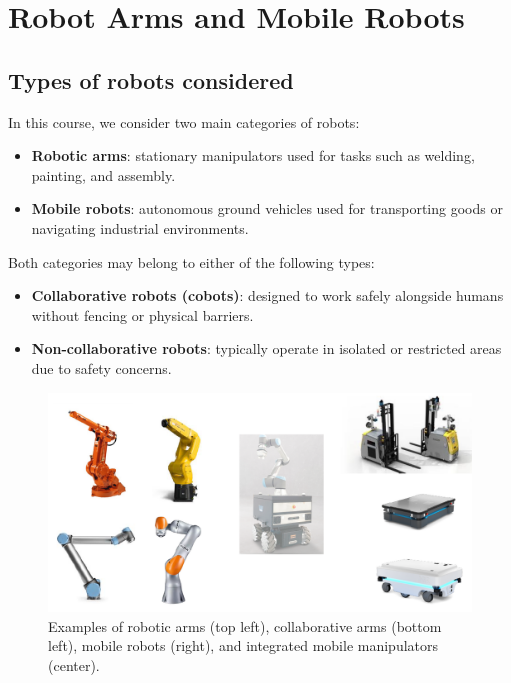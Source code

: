 \section{Robot Arms and Mobile Robots}

\subsection{Types of robots considered}

In this course, we consider two main categories of robots:
\begin{itemize}
  \item \textbf{Robotic arms}: stationary manipulators used for tasks such as welding, painting, and assembly.
  \item \textbf{Mobile robots}: autonomous ground vehicles used for transporting goods or navigating industrial environments.
\end{itemize}

Both categories may belong to either of the following types:
\begin{itemize}
  \item \textbf{Collaborative robots (cobots)}: designed to work safely alongside humans without fencing or physical barriers.
  \item \textbf{Non-collaborative robots}: typically operate in isolated or restricted areas due to safety concerns.
\end{itemize}

\begin{figure}[H]
  \centering
  \includegraphics[width=\linewidth]{imgs/robot_types.png}
  \caption{Examples of robotic arms (top left), collaborative arms (bottom left), mobile robots (right), and integrated mobile manipulators (center).}
\end{figure}

\hfill

